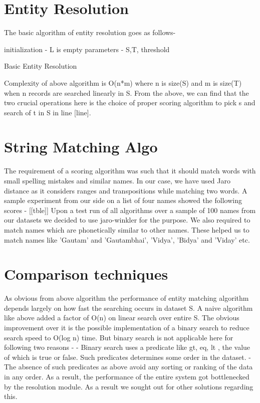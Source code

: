\section{Entity Resolution}
The basic algorithm of entity resolution goes as follows-

\begin{algorithm}[H]
initialization - L is empty \;
parameters - S,T, threshold \;
 \caption{Basic Entity Resolution}
\end{algorithm}

Complexity of above algorithm is O(n*m) where n is size(S) and m is size(T) when n records are searched linearly in S.
        From the above, we can find that the two crucial operations here is the choice of proper scoring algorithm to pick s and search of t in S in line [line].

\section{String Matching Algo}
        The requirement of a scoring algorithm was such that it should match words with small spelling mistakes and similar names. In our case, we have used Jaro distance as it considers ranges and transpositions while matching two words. A sample experiment from our side on a list of four names showed the following scores - 
        [[tble]]
        Upon a test run of all algorithms over a sample of 100 names from our datasets we decided to use jaro-winkler for the purpose. We also required to match names which are phonetically similar to other names. These helped us to match names like 'Gautam' and 'Gautambhai', 'Vidya', 'Bidya' and 'Viday' etc.

\section{Comparison techniques}
        As obvious from above algorithm the performance of entity matching algorithm depends largely on how fast the searching occurs in dataset S. A naive algorithm like above added a factor of O(n) on linear search over entire S. The obvious improvement over it is the possible implementation of a binary search to reduce search speed to O(log n) time. But binary search is not applicable here for following two reasons -
            - Binary search uses a predicate like gt, eq, lt , the value of which is true or false. Such predicates determines some order in the dataset. 
            - The absence of such predicates as above avoid any sorting or ranking of the data in any order.
        As a result, the performance of the entire system got bottlenecked by the resolution module. As a result we sought out for other solutions regarding this.

